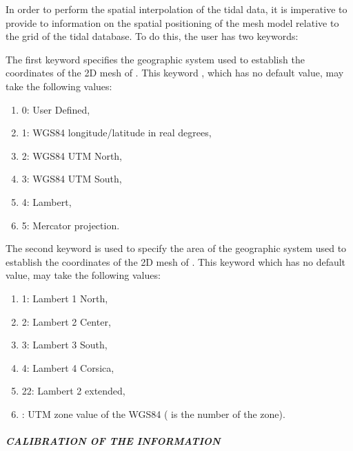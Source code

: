  In order to perform the spatial interpolation of the tidal data, it is imperative to provide to  information on the spatial positioning of the mesh model relative to the grid of the tidal database. To do this, the user has two keywords:

 The first keyword specifies the geographic system used to establish the coordinates of the 2D mesh of . This keyword , which has no default value, may take the following values:

\begin{enumerate}
\item [\nonumber] 0: User Defined,

\item [\nonumber] 1: WGS84 longitude/latitude in real degrees,

\item [\nonumber] 2: WGS84 UTM North,

\item [\nonumber] 3: WGS84 UTM South,

\item [\nonumber] 4: Lambert,

\item [\nonumber] 5: Mercator projection.
\end{enumerate}

 The second keyword is used to specify the area of the geographic system used to establish the coordinates of the 2D mesh of . This keyword  which has no default value, may take the following values:

\begin{enumerate}
\item [\nonumber] 1: Lambert 1 North,

\item [\nonumber] 2: Lambert 2 Center,

\item [\nonumber] 3: Lambert 3 South,

\item [\nonumber] 4: Lambert 4 Corsica,

\item [\nonumber] 22: Lambert 2 extended,

\item [\nonumber] : UTM zone value of the WGS84 ( is the number of the zone).
\end{enumerate}


\subparagraph{ CALIBRATION OF THE INFORMATION}

